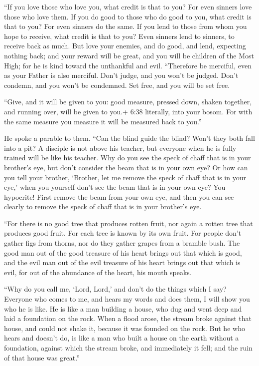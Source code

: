  ``If you love those who love you, what credit is that to
you? For even sinners love those who love them.  If you do
good to those who do good to you, what credit is that to you? For even
sinners do the same.  If you lend to those from whom you
hope to receive, what credit is that to you? Even sinners lend to
sinners, to receive back as much.  But love your enemies,
and do good, and lend, expecting nothing back; and your reward will be
great, and you will be children of the Most High; for he is kind toward
the unthankful and evil.  ``Therefore be merciful, even as
your Father is also merciful.  Don't judge, and you won't
be judged. Don't condemn, and you won't be condemned. Set free, and you
will be set free.

 ``Give, and it will be given to you: good measure, pressed
down, shaken together, and running over, will be given to you.+ 6:38
literally, into your bosom. For with the same measure you measure it
will be measured back to you.''

 He spoke a parable to them. ``Can the blind guide the
blind? Won't they both fall into a pit?  A disciple is not
above his teacher, but everyone when he is fully trained will be like
his teacher.  Why do you see the speck of chaff that is in
your brother's eye, but don't consider the beam that is in your own eye?
 Or how can you tell your brother, `Brother, let me remove
the speck of chaff that is in your eye,' when you yourself don't see the
beam that is in your own eye? You hypocrite! First remove the beam from
your own eye, and then you can see clearly to remove the speck of chaff
that is in your brother's eye.

 ``For there is no good tree that produces rotten fruit,
nor again a rotten tree that produces good fruit.  For each
tree is known by its own fruit. For people don't gather figs from
thorns, nor do they gather grapes from a bramble bush.  The
good man out of the good treasure of his heart brings out that which is
good, and the evil man out of the evil treasure of his heart brings out
that which is evil, for out of the abundance of the heart, his mouth
speaks.

 ``Why do you call me, `Lord, Lord,' and don't do the
things which I say?  Everyone who comes to me, and hears my
words and does them, I will show you who he is like.  He is
like a man building a house, who dug and went deep and laid a foundation
on the rock. When a flood arose, the stream broke against that house,
and could not shake it, because it was founded on the rock.
 But he who hears and doesn't do, is like a man who built a
house on the earth without a foundation, against which the stream broke,
and immediately it fell; and the ruin of that house was great.''

